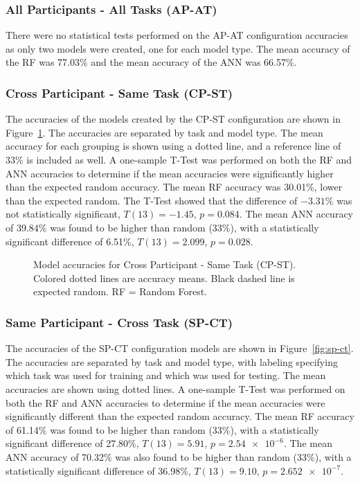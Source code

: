 \documentclass[11pt]{article}
\begin{document}
		\subsubsection{All Participants - All Tasks (AP-AT)}
		There were no statistical tests performed on the AP-AT configuration accuracies as only two models were created, one for each model type. The mean accuracy of the RF was 77.03\% and the mean accuracy of the ANN was 66.57\%.
		
		\subsubsection{Cross Participant - Same Task (CP-ST)}
		The accuracies of the models created by the CP-ST configuration are shown in Figure~\ref{fig:cp-st}. The accuracies are separated by task and model type. The mean accuracy for each grouping is shown using a dotted line, and a reference line of 33\% is included as well. A one-sample T-Test was performed on both the RF and ANN accuracies to determine if the mean accuracies were significantly higher than the expected random accuracy. The mean RF accuracy was 30.01\%, lower than the expected random. The T-Test showed that the difference of \(-3.31\%\) was not statistically significant, \(T(13) = -1.45\), \(p = 0.084\). The mean ANN accuracy of 39.84\% was found to be higher than random (33\%), with a statistically significant difference of 6.51\%, \(T(13) = 2.099\), \(p = 0.028\).
		\begin{figure}
		\centering
		\caption[Cross Participant - Same Task (CP-ST) Model Accuracies]{ Model accuracies for Cross Participant - Same Task (CP-ST). Colored dotted lines are accuracy means. Black dashed line is expected random. RF = Random Forest. }
		\label{fig:cp-st}
		\end{figure} 
		
		\subsubsection{Same Participant - Cross Task (SP-CT)}
		The accuracies of the SP-CT configuration models are shown in Figure~\ref{fig:sp-ct}. The accuracies are separated by task and model type, with labeling specifying which task was used for training and which was used for testing. The mean accuracies are shown using dotted lines. A one-sample T-Test was performed on both the RF and ANN accuracies to determine if the mean accuracies were significantly different than the expected random accuracy. The mean RF accuracy of 61.14\% was found to be higher than random (33\%), with a statistically significant difference of 27.80\%, \(T(13) = 5.91\), \(p = \num{2.54e-6}\). The mean ANN accuracy of 70.32\% was also found to be higher than random (33\%), with a statistically significant difference of 36.98\%, \(T(13) = 9.10\), \(p = \num{2.652e-7}\).
		
\end{document}
